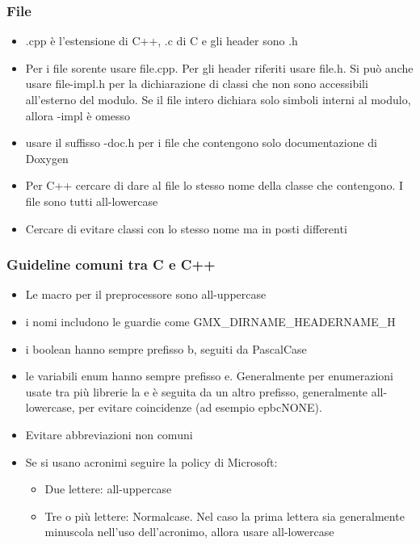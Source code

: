 \documentclass[11pt,a4paper]{book}
\begin{document}
\subsubsection{File}
\begin{itemize}
	\item .cpp è l'estensione di C++, .c di C e gli header sono .h
	\item Per i file sorente usare file.cpp. Per gli header riferiti usare file.h. Si può anche usare file-impl.h per la dichiarazione di classi che non sono accessibili all'esterno del modulo. Se il file intero dichiara solo simboli interni al modulo, allora -impl è omesso
	\item usare il suffisso -doc.h per i file che contengono solo documentazione di Doxygen
	\item Per C++ cercare di dare al file lo stesso nome della classe che contengono. I file sono tutti all-lowercase
	\item Cercare di evitare classi con lo stesso nome ma in posti differenti
\end{itemize}

\subsubsection{Guideline comuni tra C e C++}
\begin{itemize}
	\item Le macro per il preprocessore sono all-uppercase
	\item i nomi includono le guardie come GMX\_DIRNAME\_HEADERNAME\_H
	\item i boolean hanno sempre prefisso b, seguiti da PascalCase
	\item le variabili enum hanno sempre prefisso e. Generalmente per enumerazioni usate tra più librerie la e è seguita da un altro prefisso, generalmente all-lowercase, per evitare coincidenze (ad esempio epbcNONE).
	\item  Evitare abbreviazioni non comuni
	\item Se si usano acronimi seguire la policy di Microsoft:
	\begin{itemize}
		\item Due lettere: all-uppercase
		\item Tre o più lettere: Normalcase. Nel caso la prima lettera sia generalmente minuscola nell'uso dell'acronimo, allora usare all-lowercase
	\end{itemize}
\end{itemize}
\end{document}
